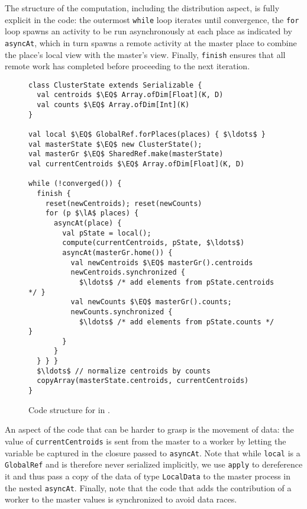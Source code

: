 The structure of the computation, including the distribution
aspect, is fully explicit in the code: the outermost \lstinline{while} loop
iterates until convergence, the \lstinline{for} loop spawns an activity to be run asynchronously at each place as indicated by \lstinline{asyncAt}, which in turn spawns a remote activity at the master place to combine the place's local view with the master's view.
Finally, \lstinline{finish} ensures that all remote work has completed before
proceeding to the next iteration.
\begin{figure}
\begin{lstlisting}
class ClusterState extends Serializable {
  val centroids $\EQ$ Array.ofDim[Float](K, D)
  val counts $\EQ$ Array.ofDim[Int](K)
}

val local $\EQ$ GlobalRef.forPlaces(places) { $\ldots$ }
val masterState $\EQ$ new ClusterState();
val masterGr $\EQ$ SharedRef.make(masterState)
val currentCentroids $\EQ$ Array.ofDim[Float](K, D)

while (!converged()) {
  finish {
    reset(newCentroids); reset(newCounts)
    for (p $\lA$ places) {
      asyncAt(place) {
        val pState = local();
        compute(currentCentroids, pState, $\ldots$)
        asyncAt(masterGr.home()) {
          val newCentroids $\EQ$ masterGr().centroids
          newCentroids.synchronized {
            $\ldots$ /* add elements from pState.centroids */ }
          val newCounts $\EQ$ masterGr().counts;
          newCounts.synchronized {
            $\ldots$ /* add elements from pState.counts */ }
        }
      }
  } } }
  $\ldots$ // normalize centroids by counts
  copyArray(masterState.centroids, currentCentroids)
}
\end{lstlisting}
\caption{Code structure for \kmeans in \apgas.\label{fig:kmeansapgas}}
\end{figure}
An aspect of the code that can be harder to grasp is the movement of data: the
value of \lstinline{currentCentroids} is sent from the master to a worker by letting the variable be captured in the closure passed to \lstinline{asyncAt}.
Note that while \lstinline{local} is a
\lstinline{GlobalRef} and is therefore never serialized implicitly, we use
\lstinline{apply} to dereference it and thus pass a copy of the data of type
\lstinline{LocalData} to the master process in the nested \lstinline{asyncAt}.
Finally, note that the code that adds the contribution of a worker to the master values is synchronized to avoid data races.


